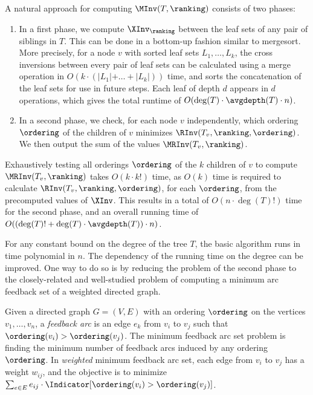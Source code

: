 A natural approach for computing $\MInv(T,\ranking)$ consists of two phases:
\begin{enumerate}
\item In a first phase, we compute $\XInv_\ranking$ between the leaf sets of any pair of siblings in $T$. This can be done in a bottom-up fashion similar to mergesort. More precisely, for a node $v$ with sorted leaf sets $L_1,\dots,L_k$, the cross inversions between every pair of leaf sets can be calculated using a merge operation in $O(k \cdot(\lvert L_1 \lvert+\dots+\lvert L_k \lvert))$ time, and sorts the concatenation of the leaf sets for use in future steps. Each leaf of depth $d$ appears in $d$ operations, which gives the total runtime of $O(\deg(T)\cdot \avgdepth(T)\cdot n)$. 
\item In a second phase, we check, for each node $v$ independently, which ordering $\ordering$ of the children of $v$ minimizes $\RInv(T_v,\ranking,\ordering)$. We then output the sum of the values $\MRInv(T_v,\ranking)$.
\end{enumerate}
Exhaustively testing all orderings $\ordering$ of the $k$ children of $v$ to compute $\MRInv(T_v,\ranking)$ takes $O(k \cdot k!)$ time, as $O(k)$ time is required to calculate $\RInv(T_v,\ranking,\ordering)$, for each $\ordering$, from the precomputed values of $\XInv$. This results in a total of $O(n \cdot \deg(T)!)$ time for the second phase, and an overall running time of $O((\deg(T)!+\deg(T)\cdot\avgdepth(T))\cdot n)$. 

For any constant bound on the degree of the tree $T$, the basic algorithm runs in time polynomial in $n$. The dependency of the running time on the degree can be improved. One way to do so is by reducing the problem of the second phase to the closely-related and well-studied problem of computing a minimum arc feedback set of a weighted directed graph.
\begin{definition}
    Given a directed graph $G=(V,E)$ with an ordering $\ordering$ on the vertices $v_1,\dots,v_n$, a \emph{feedback arc} is an edge $e_k$ from $v_i$ to $v_j$ such that $\ordering(v_i)>\ordering(v_j)$. The minimum feedback arc set problem is finding the minimum number of feedback arcs induced by any ordering $\ordering$.
    In \emph{weighted} minimum feedback arc set, each edge from $v_i$ to $v_j$ has a weight $w_{ij}$, and the objective is to minimize $\sum_{e\in E} e_{ij} \cdot \Indicator[\ordering(v_i)>\ordering(v_j)]$.
\end{definition}

